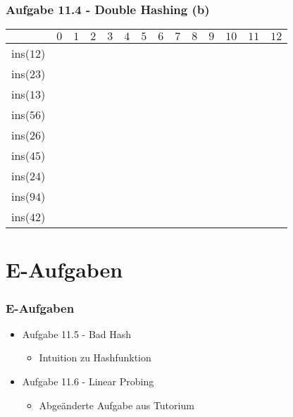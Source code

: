 \documentclass{beamer}
\begin{document}
\begin{frame}
	\frametitle{Aufgabe 11.4 - Double Hashing (b)}
	\begin{table}
		\centering
		\small
		\begin{tabular}{c|c|c|c|c|c|c|c|c|c|c|c|c|c}
			          & $0$ & $1$ & $2$ & $3$ & $4$ & $5$ & $6$ & $7$ & $8$ & $9$ & $10$ & $11$ & $12$ \\
			\hline
			ins($12$) &     &     &     &     &     &     &     &     &     &     &      &      &      \\
			\hline
			ins($23$) &     &     &     &     &     &     &     &     &     &     &      &      &      \\
			\hline
			ins($13$) &     &     &     &     &     &     &     &     &     &     &      &      &      \\
			\hline
			ins($56$) &     &     &     &     &     &     &     &     &     &     &      &      &      \\
			\hline
			ins($26$) &     &     &     &     &     &     &     &     &     &     &      &      &      \\
			\hline
			ins($45$) &     &     &     &     &     &     &     &     &     &     &      &      &      \\
			\hline
			ins($24$) &     &     &     &     &     &     &     &     &     &     &      &      &      \\
			\hline
			ins($94$) &     &     &     &     &     &     &     &     &     &     &      &      &      \\
			\hline
			ins($42$) &     &     &     &     &     &     &     &     &     &     &      &      &      \\
			\hline
		\end{tabular}
	\end{table}
\end{frame}

\section{E-Aufgaben}
\begin{frame}
	\frametitle{E-Aufgaben}
	\begin{itemize}
		\item Aufgabe 11.5 - Bad Hash \\
		      \begin{itemize}
			      \item Intuition zu Hashfunktion
		      \end{itemize}
		\item Aufgabe 11.6 - Linear Probing \\
		      \begin{itemize}
			      \item Abgeänderte Aufgabe aus Tutorium
		      \end{itemize}
	\end{itemize}
\end{frame}
\end{document}
